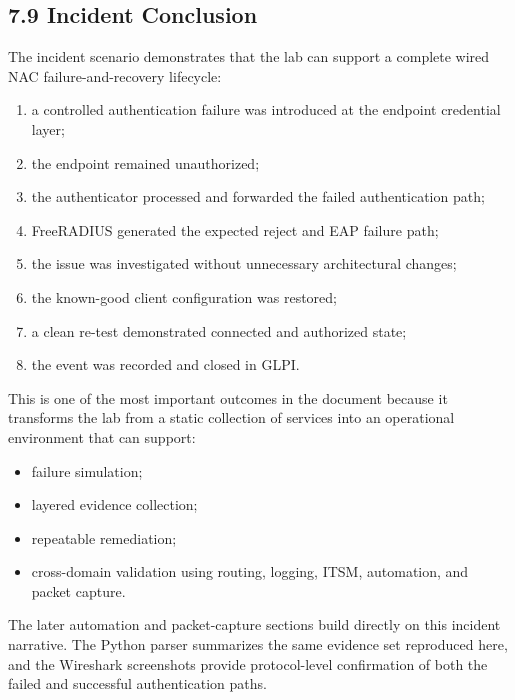 \documentclass[11pt]{article}
\begin{document}
\subsection{7.9 Incident Conclusion}
\label{sec:incident-conclusion}

The incident scenario demonstrates that the lab can support a complete wired NAC failure-and-recovery lifecycle:

\begin{enumerate}
    \item a controlled authentication failure was introduced at the endpoint credential layer;
    \item the endpoint remained unauthorized;
    \item the authenticator processed and forwarded the failed authentication path;
    \item FreeRADIUS generated the expected reject and EAP failure path;
    \item the issue was investigated without unnecessary architectural changes;
    \item the known-good client configuration was restored;
    \item a clean re-test demonstrated connected and authorized state;
    \item the event was recorded and closed in GLPI.
\end{enumerate}

This is one of the most important outcomes in the document because it transforms the lab from a static collection of services into an operational environment that can support:

\begin{itemize}
    \item failure simulation;
    \item layered evidence collection;
    \item repeatable remediation;
    \item cross-domain validation using routing, logging, ITSM, automation, and packet capture.
\end{itemize}

The later automation and packet-capture sections build directly on this incident narrative. The Python parser summarizes the same evidence set reproduced here, and the Wireshark screenshots provide protocol-level confirmation of both the failed and successful authentication paths.

\end{document}
